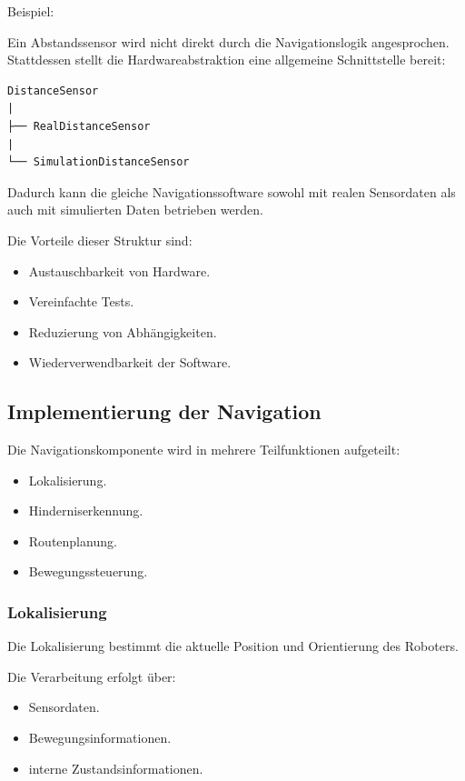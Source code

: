 Beispiel:

Ein Abstandssensor wird nicht direkt durch die Navigationslogik
angesprochen. Stattdessen stellt die Hardwareabstraktion eine allgemeine
Schnittstelle bereit:

\begin{verbatim}
DistanceSensor
|
├── RealDistanceSensor
|
└── SimulationDistanceSensor
\end{verbatim}

Dadurch kann die gleiche Navigationssoftware sowohl mit realen
Sensordaten als auch mit simulierten Daten betrieben werden.

Die Vorteile dieser Struktur sind:

\begin{itemize}
\tightlist
\item
  Austauschbarkeit von Hardware.
\item
  Vereinfachte Tests.
\item
  Reduzierung von Abhängigkeiten.
\item
  Wiederverwendbarkeit der Software.
\end{itemize}

\subsection{Implementierung der
Navigation}\label{implementierung-der-navigation}

Die Navigationskomponente wird in mehrere Teilfunktionen aufgeteilt:

\begin{itemize}
\tightlist
\item
  Lokalisierung.
\item
  Hinderniserkennung.
\item
  Routenplanung.
\item
  Bewegungssteuerung.
\end{itemize}

\subsubsection{Lokalisierung}\label{lokalisierung}

Die Lokalisierung bestimmt die aktuelle Position und Orientierung des
Roboters.

Die Verarbeitung erfolgt über:

\begin{itemize}
\tightlist
\item
  Sensordaten.
\item
  Bewegungsinformationen.
\item
  interne Zustandsinformationen.
\end{itemize}

